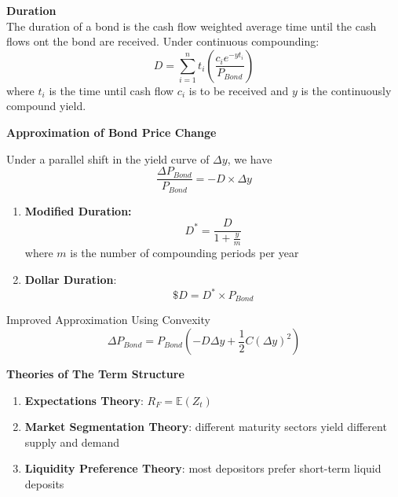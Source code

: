 \documentclass[11pt,fleqn]{book} %
\numberwithin{equation}{section} %
\numberwithin{figure}{section} %
\numberwithin{table}{section} %
\begin{document}
\begin{definition}\textbf{Duration}\\
The duration of a bond is the cash flow weighted average time until the cash flows ont the bond are received. Under continuous compounding:
$$
D=\sum_{i=1}^nt_i\left(\frac{c_ie^{-yt_i}}{P_{Bond}}\right)
$$
where $t_i$ is the time until cash flow $c_i$ is to be received and $y$ is the continuously compound yield.
\end{definition}
\begin{theorem}\textbf{Approximation of Bond Price Change}

Under a parallel shift in the yield curve of $\Delta y$, we have
$$
\frac{\Delta P_{Bond}}{P_{Bond}}=-D\times\Delta y
$$
\end{theorem}
\begin{definition}

\begin{enumerate}
    \item \textbf{Modified Duration:}
    $$
    D^*=\frac{D}{1+\frac{y}{m}}
    $$
    where $m$ is the number of compounding periods per year
    \item \textbf{Dollar Duration}:
    $$
    \$D=D^*\times P_{Bond}
    $$
\end{enumerate}
\end{definition}
\begin{theorem}Improved Approximation Using Convexity
$$
\Delta P_{Bond}= P_{Bond}\left(-D\Delta y+\frac{1}{2}C(\Delta y)^2\right)
$$
\end{theorem}
\begin{proposition}\textbf{Theories of The Term Structure}
\begin{enumerate}
    \item \textbf{Expectations Theory}: $R_F=\mathbb{E}(Z_t)$
    \item \textbf{Market Segmentation Theory}: different maturity sectors yield different supply and demand
    \item \textbf{Liquidity Preference Theory}: most depositors prefer short-term liquid deposits
\end{enumerate}

\end{proposition}
\end{document}
